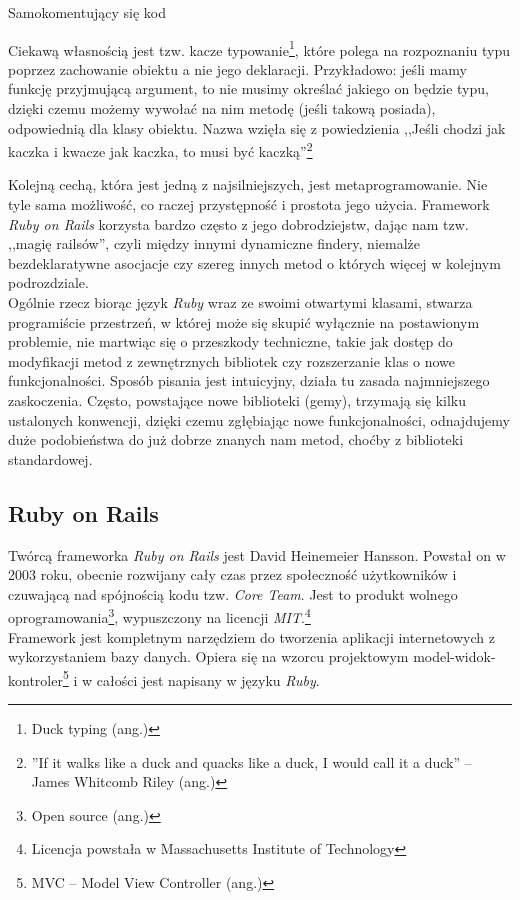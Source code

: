 \documentclass[a4paper,12pt]{article}
\begin{document}
\begin{listing}
  
  \caption{Samokomentujący się kod}
  \label{listing:selfcommenting}
\end{listing}


Ciekawą własnością jest tzw. kacze typowanie\footnote{Duck typing (ang.)}, które polega na
rozpoznaniu typu poprzez zachowanie obiektu a nie jego deklaracji. Przykładowo: jeśli mamy
funkcję przyjmującą argument, to nie musimy określać jakiego on będzie typu, dzięki czemu
możemy wywołać na nim metodę (jeśli takową posiada), odpowiednią dla klasy obiektu. Nazwa
wzięła się z powiedzienia ,,Jeśli chodzi jak kaczka i kwacze jak kaczka, to musi być
kaczką''\footnote{''If it walks like a duck and quacks like a duck, I would call it a duck''
-- James Whitcomb Riley (ang.)}


Kolejną cechą, która jest jedną z najsilniejszych, jest metaprogramowanie. Nie tyle sama
możliwość, co raczej przystępność i prostota jego użycia. Framework \emph{Ruby on Rails}
korzysta bardzo często z jego dobrodziejstw, dając nam tzw. ,,magię railsów'', czyli
między innymi dynamiczne findery, niemalże bezdeklaratywne asocjacje czy szereg innych
metod o których więcej w kolejnym podrozdziale.\\
Ogólnie rzecz biorąc język \emph{Ruby} wraz ze swoimi otwartymi klasami, stwarza
programiście przestrzeń, w której może się skupić wyłącznie na postawionym problemie, nie
martwiąc się o przeszkody techniczne, takie jak dostęp do modyfikacji metod z zewnętrznych
bibliotek czy rozszerzanie klas o nowe funkcjonalności. Sposób pisania jest intuicyjny,
działa tu zasada najmniejszego zaskoczenia. Często, powstające nowe biblioteki (gemy), trzymają
się kilku ustalonych konwencji, dzięki czemu zgłębiając nowe funkcjonalności, odnajdujemy
duże podobieństwa do już dobrze znanych nam metod, choćby z biblioteki standardowej.


\subsection{Ruby on Rails}
Twórcą frameworka \emph{Ruby on Rails} jest David Heinemeier Hansson. Powstał on w 2003
roku, obecnie rozwijany cały czas przez społeczność użytkowników i czuwającą nad
spójnością kodu tzw. \emph{Core Team}. Jest to produkt wolnego
oprogramowania\footnote{Open source (ang.)}, wypuszczony na licencji
\emph{MIT}.\footnote{Licencja powstała w Massachusetts Institute of Technology}\\
Framework jest kompletnym narzędziem do tworzenia aplikacji internetowych z wykorzystaniem
bazy danych. Opiera się na wzorcu projektowym model-widok-kontroler\footnote{MVC -- Model View
Controller (ang.)} i w całości jest napisany w języku \emph{Ruby}.
\end{document}
